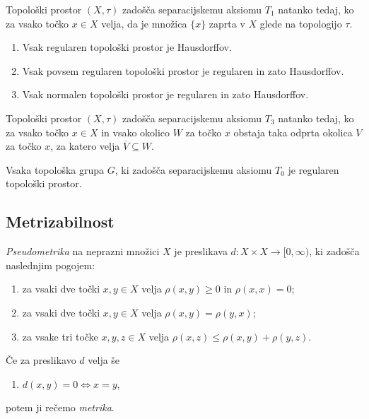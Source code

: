 \documentclass[mat1]{fmfdelo}
\newcommand{\closure}[1]{\overline{#1}}
\begin{document}
\begin{trditev}\label{def:kart1}
	Topološki prostor $(X, \tau)$ zadošča separacijskemu aksiomu $T_1$ natanko tedaj, ko za vsako točko $x \in X$ velja, da je množica $\lbrace x \rbrace$ zaprta v $X$ glede na topologijo $\tau$.
\end{trditev}

\begin{posledica}\label{pos:reghaus}
	\begin{enumerate}
		\item Vsak regularen topološki prostor je Hausdorffov.
		\item Vsak povsem regularen topološki prostor je regularen in zato Hausdorffov.
		\item Vsak normalen topološki prostor je regularen in zato Hausdorffov.
	\end{enumerate}
\end{posledica}

\begin{trditev}\label{def:kart3}
	Topološki prostor $(X, \tau)$ zadošča separacijskemu aksiomu $T_3$ natanko tedaj, ko za vsako točko $x \in X$ in vsako okolico $W$ za točko $x$ obstaja taka odprta okolica $V$ za točko $x$, za katero velja $\closure{V} \subseteq W$.
\end{trditev}

\begin{izrek}\label{izr:t3}
	Vsaka topološka grupa $G$, ki zadošča separacijskemu aksiomu $T_0$ je regularen topološki prostor.
\end{izrek}

\subsection{Metrizabilnost}

\begin{definicija}\label{def:metrika}
	\emph{Pseudometrika} na neprazni množici $X$ je preslikava $d: X \times X \to  [0, \infty)$, ki zadošča naslednjim pogojem:
	\begin{enumerate}
		\item za vsaki dve točki $x, y \in X$ velja $\rho (x, y) \geq 0$ in $\rho (x, x) = 0$;
		\item za vsaki dve točki $x, y \in X$ velja $\rho (x, y) = \rho (y, x)$;
		\item za vsake tri točke $x, y, z \in X$ velja $\rho (x, z) \leq \rho (x, y) + \rho (y, z)$.
	\end{enumerate}
	Če za preslikavo $d$ velja še
	\begin{enumerate}[resume]
		\item $d(x,y) = 0 \iff x = y$,
	\end{enumerate}
	potem ji rečemo \emph{metrika}.
\end{definicija}
\end{document}
